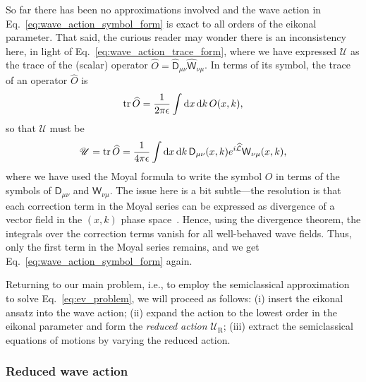 So far there has been no approximations involved and the wave action in Eq.~\eqref{eq:wave_action_symbol_form} is exact to all orders of the eikonal parameter.
That said, the curious reader may wonder there is an inconsistency here, in light of Eq.~\eqref{eq:wave_action_trace_form}, where we have expressed $\mathscr{U}$ as the trace of the (scalar) operator $\widehat{O} = \widehat{\mathsf{D}}_{\mu\nu}\widehat{\mathsf{W}}_{\nu\mu}$.
In terms of its symbol, the trace of an operator $\widehat{O}$ is
%
\begin{equation}
  \operatorname{tr}\widehat{O} = \frac{1}{2\pi\epsilon} \int \mathrm{d}{x}\,\mathrm{d}{k}\, O(x, k),
\end{equation}
%
so that $\mathscr{U}$ must be
%
\begin{equation}
  \mathscr{U} = \operatorname{tr}{\widehat{O}} = \frac{1}{4\pi\epsilon}\int \mathrm{d}{x}\,\mathrm{d}{k}\, \mathsf{D}_{\mu\nu}(x,k)e^{i\widehat{\mathcal{L}}}\mathsf{W}_{\nu\mu}(x, k),
\end{equation}
%
where we have used the Moyal formula to write the symbol $O$ in terms of the symbols of $\mathsf{D}_{\mu\nu}$ and $\mathsf{W}_{\nu\mu}$.
The issue here is a bit subtle---the resolution is that each correction term in the Moyal series can be expressed as divergence of a vector field in the $(x, k)$ phase space~\cite[Problem 3.16]{tracy2014}.
Hence, using the divergence theorem, the integrals over the correction terms vanish for all well-behaved wave fields.
Thus, only the first term in the Moyal series remains, and we get Eq.~\eqref{eq:wave_action_symbol_form} again.

Returning to our main problem, i.e., to employ the semiclassical approximation to solve Eq.~\eqref{eq:ev_problem}, we will proceed as follows: (i) insert the eikonal ansatz into the wave action; (ii) expand the action to the lowest order in the eikonal parameter and form the \emph{reduced action} $\mathscr{U}_{\text{R}}$; (iii) extract the semiclassical equations of motions by varying the reduced action.

\subsubsection*{Reduced wave action}
\label{page:redaction}

